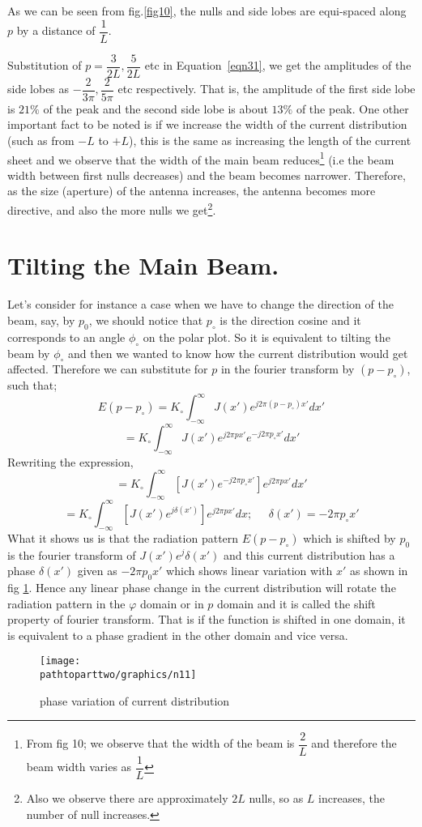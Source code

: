 As we can be seen from fig.\ref{fig10}, the nulls and side lobes are equi-spaced along $p$ by a distance of $\dfrac{1}{L}$.

Substitution of $p = \dfrac{3}{2L}, \dfrac{5}{2L}$ etc in Equation~\ref{eqn31}, we get the amplitudes of the side lobes as $-\dfrac{2}{3\pi}, \dfrac{2}{5\pi}$ etc respectively. That is, the amplitude of the first side lobe is $21\% $ of the peak and the second side lobe is about $13\%$ of the peak. One other important fact to be noted is if we increase the width of the current distribution (such as from $-L$ to $+L$), this is the same as increasing the length of the current sheet and we observe that the width of the main beam reduces\footnote{From fig 10; we observe that the width of the beam is $\dfrac{2}{L}$ and therefore the beam width varies as $\dfrac{1}{L}$} (i.e the beam width between first nulls decreases) and the beam becomes narrower. Therefore, as the size (aperture) of the antenna increases, the antenna becomes more directive, and also the more nulls we get\footnote{Also we observe there are approximately $2L$ nulls, so as $L$ increases, the number of null increases.}.

\section{Tilting the Main Beam.}
Let's consider for instance a case when we have to change the direction of the beam, say, by $p_0$, we should notice that $p_\circ$ is the direction cosine and it corresponds to an angle $\phi_\circ$ on the polar plot. So it is equivalent to tilting the beam by $\phi_\circ$ and then we wanted to know how the current distribution would get affected. Therefore we can substitute for $p$ in the fourier transform by $(p - p_\circ)$, such that;
$$E(p - p_\circ) = K_\circ\int_{-\infty}^{\infty} J(x') e^{j2\pi (p - p_\circ)x'} dx'$$
$$= K_\circ\int_{-\infty}^{\infty} J(x') e^{j2\pi px'}  e^{-j2\pi p_\circ x'} dx'$$
Rewriting the expression,
$$= K_\circ\int_{-\infty}^{\infty} [J(x') e^{-j2\pi p_\circ x'}] e^{j2\pi px'} dx'$$
$$ = K_\circ\int_{-\infty}^{\infty} [J(x') e^{j\delta (x')}] e^{j2\pi px'} dx ;\; \; \; \; \; \delta(x') = -2\pi p_\circ x'$$
What it shows us is that the radiation pattern $E(p - p_\circ)$ which is shifted by $p_0$ is the fourier transform of  $J(x')e^j\delta(x')$ and this current distribution has a phase $\delta(x')$ given as $-2\pi p_0x'$ which shows linear variation with $x'$ as shown in fig \ref{fig11}. Hence any linear phase change in the current distribution will rotate the radiation pattern in the $\varphi$ domain or in $p$ domain and it is called the shift property of fourier transform. That is if the function is shifted in one domain, it is equivalent to a phase gradient in the other domain and vice versa.
\begin{figure}[h]
\centering
\texttt{[image: \\pathtoparttwo/graphics/n11]}
\caption{phase variation of current distribution}
\label{fig11}
\end{figure}

